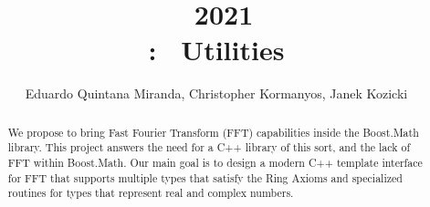 \documentclass[11pt,a4paper]{article}
\title{\gsoc\ 2021\\\boostmath: \fft\ Utilities}
\author{Eduardo Quintana Miranda, Christopher Kormanyos, Janek Kozicki}
\begin{document}
\maketitle
\begin{abstract}
We propose to bring Fast Fourier Transform (FFT) capabilities
inside the Boost.Math library. This project answers the need for a C++ library
of this sort, and the lack of FFT within Boost.Math.
Our main goal is to design a modern C++ template interface for FFT
that supports multiple types that satisfy the Ring Axioms and specialized
routines for types that represent real and complex numbers.
\end{abstract}

\tableofcontents





    


\appendix

\end{document}
